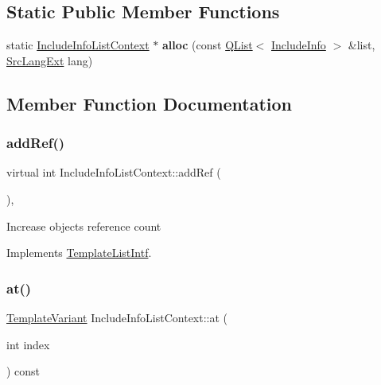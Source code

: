\subsection*{Static Public Member Functions}
\begin{DoxyCompactItemize}
\item 
\mbox{\label{class_include_info_list_context_a79ba6505025ee45f00a897b816f145a3}} 
static \mbox{\hyperlink{class_include_info_list_context}{Include\+Info\+List\+Context}} $\ast$ {\bfseries alloc} (const \mbox{\hyperlink{class_q_list}{Q\+List}}$<$ \mbox{\hyperlink{struct_include_info}{Include\+Info}} $>$ \&list, \mbox{\hyperlink{types_8h_a9974623ce72fc23df5d64426b9178bf2}{Src\+Lang\+Ext}} lang)
\end{DoxyCompactItemize}


\subsection{Member Function Documentation}
\mbox{\label{class_include_info_list_context_ab45ef3751c5ce2e342a23d8a240cee07}} 
\subsubsection{\texorpdfstring{addRef()}{addRef()}}
{\footnotesize\ttfamily virtual int Include\+Info\+List\+Context\+::add\+Ref (\begin{DoxyParamCaption}{ }\end{DoxyParamCaption})\hspace{0.3cm}{\ttfamily [inline]}, {\ttfamily [virtual]}}

Increase object\textquotesingle{}s reference count 

Implements \mbox{\hyperlink{class_template_list_intf_a4b4973e2e15396d10bc4e3085462ca2b}{Template\+List\+Intf}}.

\mbox{\label{class_include_info_list_context_abdbdfb96f30dc9a64e42e01154fd30ff}} 
\subsubsection{\texorpdfstring{at()}{at()}}
{\footnotesize\ttfamily \mbox{\hyperlink{class_template_variant}{Template\+Variant}} Include\+Info\+List\+Context\+::at (\begin{DoxyParamCaption}\item[{int}]{index }\end{DoxyParamCaption}) const\hspace{0.3cm}{\ttfamily [virtual]}}

